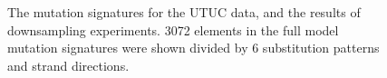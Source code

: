 \begin{figure}[ht]
\quad
{}
%
\caption{The mutation signatures for the UTUC data, and the results of downsampling experiments. 
3072 elements in the full model mutation signatures were shown divided by 6 substitution patterns and strand directions.}
\label{UTUC}
\end{figure}


\clearpage

